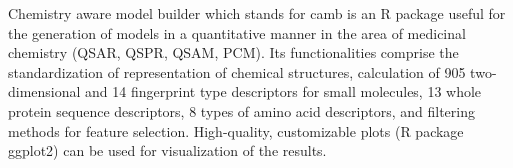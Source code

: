 Chemistry aware model builder which stands for camb is an R package useful for the generation of models in a quantitative manner in the area of medicinal chemistry (QSAR, QSPR, QSAM, PCM). Its functionalities comprise the standardization of representation of chemical structures, calculation of 905 two-dimensional and 14 fingerprint type descriptors for small molecules, 13 whole protein sequence descriptors, 8 types of amino acid descriptors, and filtering methods for feature selection.  High-quality, customizable plots (R package ggplot2) can be used for visualization of the results. 